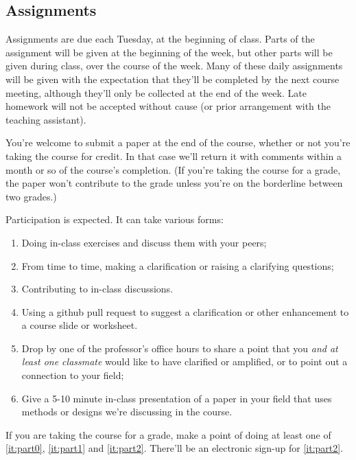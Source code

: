 \documentclass[12pt]{article}
\begin{document}
\subsection{Assignments}
Assignments are due each Tuesday, at the beginning of
class. Parts of the assignment will be given at the beginning of the
week, but other parts will be given during class, over the course of
the week.  Many of these daily assignments will be given with the
expectation that they'll be completed by the next course meeting,
although they'll only be collected at the end of the week.
Late homework will not be accepted without cause (or prior arrangement
with the teaching assistant).   

You're welcome to submit a paper at the end of the course, whether or not you're taking the course for credit.  In that case we'll return it with comments within a month or so of the course's completion.  (If you're taking the course for a grade, the paper won't contribute to the grade unless you're on  the borderline between two grades.) 

Participation is expected.  It can take various forms:
\begin{enumerate}
\item Doing in-class exercises and discuss them with your peers;
\item From time to time, making a clarification or raising a clarifying questions;
\item Contributing to in-class discussions.
\item \label{it:part0} Using a github pull request to suggest a clarification or other enhancement to
  a course slide or worksheet.
\item \label{it:part1} Drop by one of the professor's office hours to share a point
  that you \textit{and at least one classmate} would like to have clarified or
  amplified, or to point out a connection to your field; 
\item \label{it:part2} Give a 5-10 minute in-class presentation of a paper in your
  field that uses methods or designs we're discussing in the course.
\end{enumerate}
If you are taking the course for a grade, make a point of doing at
least one of \ref{it:part0}, \ref{it:part1} and \ref{it:part2}.  There'll be an
electronic sign-up for \ref{it:part2}.

\end{document}
